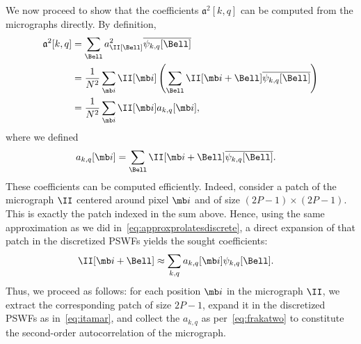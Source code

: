 \documentclass[9pt,twocolumn,twoside,lineno]{pnas-new}
\begin{document}
We now proceed to show that the coefficients $\mathfrak{a}^2[k, q]$ can be computed from the micrographs directly.
By definition,
\begin{align}
\mathfrak{a}^2[k,q] & =\sum_{\Bell} a^2_\II[\Bell] \overline{\psi_{k,q}[\Bell]} \nonumber\\
& = \frac{1}{N^2}\sum_{\mb i}\II[\mb i]\left(\sum_{\Bell}\II[\mb i+\Bell]\overline{\psi_{k,q}[\Bell]}\right) \nonumber \\
& = \frac{1}{N^2}\sum_{\mb i}\II[\mb i] a_{k,q}[\mb i], \label{eq:frakatwo}
\end{align}
where we defined
\begin{align}
a_{k,q}[\mb i] & = \sum_{\Bell}\II[\mb i+\Bell]\overline{\psi_{k,q}[\Bell]}.
\label{eq:patchcoefficients}
\end{align}
These coefficients can be computed efficiently. Indeed, consider a patch of the micrograph $\II$ centered around pixel $\mb i$ and of size $(2P-1) \times (2P-1)$. This is exactly the patch indexed in the sum above. Hence, using the same approximation as we did in~\eqref{eq:approxprolatesdiscrete}, a direct expansion of that patch in the discretized PSWFs yields the sought coefficients:
\begin{align}
\II[\mb i+\Bell] & \approx \sum_{k,q} a_{k,q}[\mb i] \psi_{k,q}[\Bell]. \label{eq:itamar}
\end{align}
Thus, we proceed as follows:
for each position $\mb i$ in the micrograph $\II$, we extract the corresponding patch of size $2P-1$, expand it in the discretized PSWFs as in~\eqref{eq:itamar}, and collect the $a_{k,q}$ as per~\eqref{eq:frakatwo} to constitute the second-order autocorrelation of the micrograph.
\end{document}
